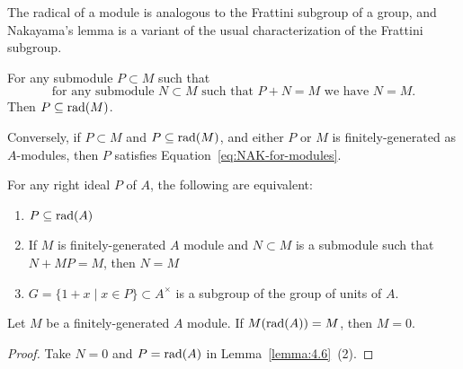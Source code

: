 \begin{remark}
The radical of a module is analogous to the Frattini subgroup of a
group, and Nakayama's lemma is a variant of the usual characterization
of the Frattini subgroup.
\end{remark}

\begin{lemma}\label{lemma:4.5}
For any submodule $P\subset M$ such that
\begin{equation}\label{eq:NAK-for-modules}
\mbox{for any submodule }N\subset M\mbox{ such that }P+N=M\mbox{ we
  have }N=M.
\end{equation}
Then $P\subseteq\operatorname{rad}(M)$.

Conversely, if $P\subset M$ and $P\subseteq\operatorname{rad}(M)$, and either $P$ or
$M$ is finitely-generated as $A$-modules, then $P$ satisfies Equation~\eqref{eq:NAK-for-modules}.
\end{lemma}

\begin{lemma}\label{lemma:4.6}
For any right ideal $P$ of $A$, the following are equivalent:
\begin{enumerate}
\item $P\subseteq\operatorname{rad}(A)$
\item If $M$ is finitely-generated $A$ module and $N\subset M$ is a
  submodule such that $N+MP=M$, then $N=M$
\item $G=\{1+x\mid x\in P\}\subset A^{\times}$ is a subgroup of the
  group of units of $A$.
\end{enumerate}
\end{lemma}

\begin{corollary}\label{cor:4.7}
Let $M$ be a finitely-generated $A$ module. If $M(\operatorname{rad}(A))=M$, then $M=0$.
\end{corollary}

\begin{proof}
Take $N=0$ and $P=\operatorname{rad}(A)$ in Lemma~\ref{lemma:4.6}~(2).
\end{proof}